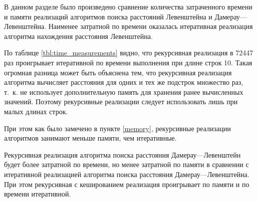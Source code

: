 В данном разделе было произведено сравнение количества затраченного времени и памяти реализаций алгоритмов поиска расстояний Левенштейна и
Дамерау---Левенштейна. Наименее затратной по времени оказалась итеративная реализация алгоритма нахождения расстояния Левенштейна.

По таблице \ref{tbl:time_measurements} видно, что рекурсивная реализация в 72447 раз проигрывает итеративной по времени выполнения при длине строк 10. Такая огромная разница может быть объяснена тем, что рекурсивная реализация алгоритма вычисляет расстояния для одних и тех же подстрок множество раз, т.~к. не использует дополнительную память для хранения ранее вычисленных значений. Поэтому рекурсивные реализации следует использовать лишь при малых длинах строк.

При этом как было замечено в пункте \ref{memory}, рекурсивные реализации алгоритмов занимают меньше памяти, чем итеративные.

Рекурсивная реализация алгоритма поиска расстояния Дамерау---Левенштейн будет более затратной по времени, но менее затратной по памяти в сравнении с итеративной реализацией алгоритма поиска расстояния Дамерау---Левенштейна. При этом рекурсивная с кешированием реализация проигрывает по памяти и по времени итеративной.